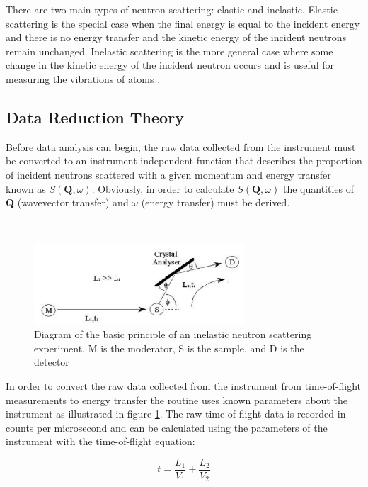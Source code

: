 \documentclass[paper=a4, fontsize=11pt]{scrartcl}	%
\numberwithin{equation}{section}															%
\numberwithin{figure}{section}																%
\numberwithin{table}{section}																%
\begin{document}
There are two main types of neutron scattering: elastic and inelastic. Elastic scattering is the special case when the final energy is equal to the incident energy and there is no energy transfer and the kinetic energy of the incident neutrons remain unchanged. Inelastic scattering is the more general case where some change in the kinetic energy of the incident neutron occurs and is useful for measuring the vibrations of atoms \cite{rpynn2008}.


\subsection{Data Reduction Theory}
Before data analysis can begin, the raw data collected from the instrument must be converted to an instrument independent function that describes the proportion of incident neutrons scattered with a given momentum and energy transfer known as $S(\mathbf{Q},\omega)$. Obviously, in order to calculate $S(\mathbf{Q},\omega)$ the quantities of \textbf{Q} (wavevector transfer) and $\omega$ (energy transfer) must be derived.

\mbox{ }\\
\begin{figure}[H]
\centering
\includegraphics[width=0.7\textwidth]{img/instrument-diagram.png}
\caption{Diagram of the basic principle of an inelastic neutron scattering experiment. M is the moderator, S is the sample, and D is the detector \cite{smukhopadhyay2014}}
\label{fig:instrument-setup}
\end{figure}

In order to convert the raw data collected from the instrument from time-of-flight measurements to energy transfer the routine uses known parameters about the instrument as illustrated in figure \ref{fig:instrument-setup}. The raw time-of-flight data is recorded in counts per microsecond and can be calculated using the parameters of the instrument with the time-of-flight equation:

\begin{equation}
\label{eq:time-of-flight}
t = \frac{L_1}{V_1} + \frac{L_2}{V_2}
\end{equation}
\end{document}
